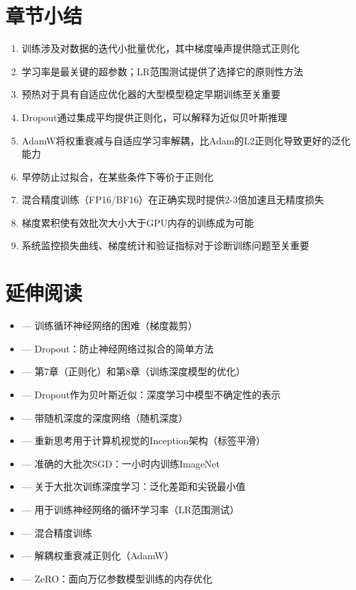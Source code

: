 \section{章节小结}

\begin{enumerate}
    \item 训练涉及对数据的迭代小批量优化，其中梯度噪声提供隐式正则化
    \item 学习率是最关键的超参数；LR范围测试提供了选择它的原则性方法
    \item 预热对于具有自适应优化器的大型模型稳定早期训练至关重要
    \item Dropout通过集成平均提供正则化，可以解释为近似贝叶斯推理
    \item AdamW将权重衰减与自适应学习率解耦，比Adam的L2正则化导致更好的泛化能力
    \item 早停防止过拟合，在某些条件下等价于正则化
    \item 混合精度训练（FP16/BF16）在正确实现时提供2-3倍加速且无精度损失
    \item 梯度累积使有效批次大小大于GPU内存的训练成为可能
    \item 系统监控损失曲线、梯度统计和验证指标对于诊断训练问题至关重要
\end{enumerate}

\section{延伸阅读}

\begin{itemize}
    \item \cite{pascanu2013difficulty} --- 训练循环神经网络的困难（梯度裁剪）
    \item \cite{srivastava2014dropout} --- Dropout：防止神经网络过拟合的简单方法
    \item \cite{goodfellow2016deep} --- 第7章（正则化）和第8章（训练深度模型的优化）
    \item \cite{gal2016dropout} --- Dropout作为贝叶斯近似：深度学习中模型不确定性的表示
    \item \cite{huang2016deep} --- 带随机深度的深度网络（随机深度）
    \item \cite{szegedy2016rethinking} --- 重新思考用于计算机视觉的Inception架构（标签平滑）
    \item \cite{goyal2017accurate} --- 准确的大批次SGD：一小时内训练ImageNet
    \item \cite{keskar2017largebatch} --- 关于大批次训练深度学习：泛化差距和尖锐最小值
    \item \cite{smith2017cyclical} --- 用于训练神经网络的循环学习率（LR范围测试）
    \item \cite{micikevicius2018mixed} --- 混合精度训练
    \item \cite{loshchilov2019decoupled} --- 解耦权重衰减正则化（AdamW）
    \item \cite{rajbhandari2020zero} --- ZeRO：面向万亿参数模型训练的内存优化
\end{itemize}

